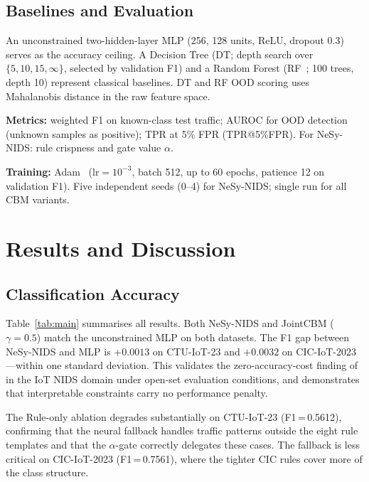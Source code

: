 \documentclass[conference]{IEEEtran}
\begin{document}
\subsection{Baselines and Evaluation}

An unconstrained two-hidden-layer MLP (256, 128 units, ReLU, dropout
0.3) serves as the accuracy ceiling. A Decision Tree (DT; depth search
over $\{5,10,15,\infty\}$, selected by validation F1) and a Random
Forest (RF~\cite{breiman2001random}; 100 trees, depth 10) represent
classical baselines. DT and RF OOD scoring uses Mahalanobis distance
in the raw feature space.

\textbf{Metrics:} weighted F1 on known-class test traffic; AUROC for
OOD detection (unknown samples as positive); TPR at 5\% FPR
(TPR@5\%FPR). For NeSy-NIDS: rule crispness and gate value $\alpha$.

\textbf{Training:} Adam~\cite{kingma2014adam} ($\mathrm{lr}{=}10^{-3}$,
batch 512, up to 60 epochs, patience 12 on validation F1). Five
independent seeds (0--4) for NeSy-NIDS; single run for all CBM
variants.

\section{Results and Discussion}

\subsection{Classification Accuracy}

\begin{sloppypar}
Table~\ref{tab:main} summarises all results. Both NeSy-NIDS and
JointCBM ($\gamma{=}0.5$) match the unconstrained MLP on both datasets.
The F1 gap between NeSy-NIDS and MLP is $+0.0013$ on CTU-IoT-23 and
$+0.0032$ on CIC-IoT-2023---within one standard deviation. This
validates the zero-accuracy-cost finding of~\cite{koh2020concept}
in the IoT NIDS domain under open-set evaluation conditions, and
demonstrates that interpretable constraints carry no performance
penalty.
\end{sloppypar}

The Rule-only ablation degrades substantially on CTU-IoT-23
(F1\,=\,0.5612), confirming that the neural fallback handles traffic
patterns outside the eight rule templates and that the $\alpha$-gate
correctly delegates these cases. The fallback is less critical on
CIC-IoT-2023 (F1\,=\,0.7561), where the tighter CIC rules cover more
of the class structure.
\end{document}
